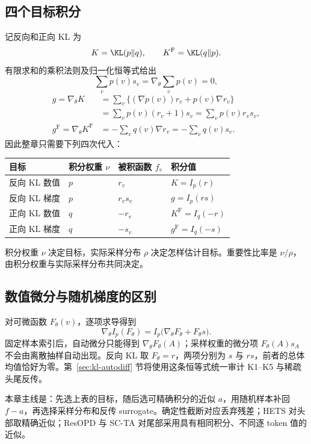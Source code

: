 \subsection{四个目标积分}
记反向和正向 KL 为
\[
 K=\KL(p\Vert q),\qquad K^{\mathrm F}=\KL(q\Vert p).
\]
有限求和的乘积法则及归一化恒等式给出
\[
 \sum_vp(v)s_v=\nabla_\theta\sum_vp(v)=0,
\]
\begin{align*}
 g=\nabla_\theta K
 &=\sum_v\{(\nabla p(v))r_v+p(v)\nabla r_v\}\\
 &=\sum_vp(v)(r_v+1)s_v=\sum_vp(v)r_vs_v,\\
 g^{\mathrm F}=\nabla_\theta K^{\mathrm F}
 &=-\sum_vq(v)\nabla r_v=-\sum_vq(v)s_v.
\end{align*}
因此整章只需要下列四次代入：
\begin{center}
\begin{tabular}{llll}
\toprule
目标 & 积分权重 $\nu$ & 被积函数 $f_v$ & 积分值\\
\midrule
反向 KL 数值 & $p$ & $r_v$ & $K=I_p(r)$\\
反向 KL 梯度 & $p$ & $r_vs_v$ & $g=I_p(rs)$\\
正向 KL 数值 & $q$ & $-r_v$ & $K^{\mathrm F}=I_q(-r)$\\
正向 KL 梯度 & $q$ & $-s_v$ & $g^{\mathrm F}=I_q(-s)$\\
\bottomrule
\end{tabular}
\end{center}
积分权重 $\nu$ 决定目标，实际采样分布 $\rho$ 决定怎样估计目标。重要性比率是 $\nu/\rho$，由积分权重与实际采样分布共同决定。

\subsection{数值微分与随机梯度的区别}
对可微函数 $F_\theta(v)$，逐项求导得到
\begin{equation}\label{eq:kl-measure-derivative}
 \nabla_\theta I_p(F_\theta)
 =I_p\bigl(\nabla_\theta F_\theta+F_\theta s\bigr).
\end{equation}
固定样本索引后，自动微分只能得到 $\nabla_\theta F_\theta(A)$；采样权重的微分项 $F_\theta(A)s_A$ 不会由离散抽样自动出现。反向 KL 取 $F_\theta=r$，两项分别为 $s$ 与 $rs$，前者的总体均值恰好为零。第~\ref{sec:kl-autodiff} 节将使用这条恒等式统一审计 K1--K5 与稀疏头尾反传。

本章主线是：先选上表的目标，随后选可精确积分的近似 $a$，用随机样本补回 $f-a$，再选择采样分布和反传 surrogate。确定性截断对应丢弃残差；HETS 对头部取精确近似；ResOPD 与 SC-TA 对尾部采用具有相同积分、不同逐 token 值的近似。










